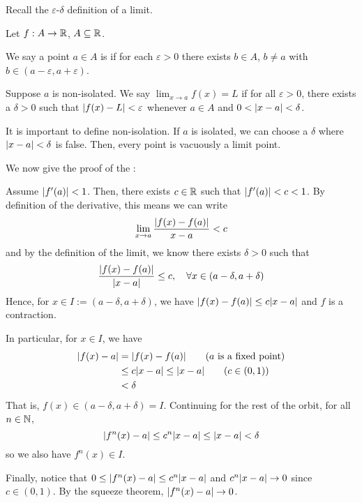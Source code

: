 \documentclass[class=pmath370,tikz,notes]{agony}
\begin{document}
Recall the $\varepsilon$-$\delta$ definition of a limit.

\begin{defn*}
  Let $f : A \to \mathbb{R}$, $A \subseteq \mathbb{R}$.

  We say a point $a \in A$ is  if for each $\varepsilon > 0$
  there exists $b \in A$, $b \neq a$ with $b \in (a-\varepsilon,a+\varepsilon)$.

  Suppose $a$ is non-isolated. We say $\lim_{x\to a}f(x) = L$
  if for all $\varepsilon > 0$, there exists a $\delta > 0$
  such that $\abs{f(x)-L}<\varepsilon$ whenever $a \in A$ and $0 < \abs{x-a} < \delta$.
\end{defn*}

It is important to define non-isolation.
If $a$ is isolated, we can choose a $\delta$ where $\abs{x-a} < \delta$ is false.
Then, every point is vacuously a limit point.

We now give the proof of the :
\begin{prf}
  Assume $\abs{f'(a)} < 1$. Then, there exists $c \in \mathbb{R}$ such that $\abs{f'(a)} < c < 1$.
  By definition of the derivative, this means we can write
  \[ \lim_{x\to a}\frac{\abs{f(x)-f(a)}}{x-a} < c \]
  and by the definition of the limit, we know there exists $\delta > 0$ such that
  \[ \frac{\abs{f(x)-f(a)}}{\abs{x-a}} \leq c \qc{\forall x\in (a-\delta,a+\delta)} \]
  Hence, for $x \in I := (a-\delta,a+\delta)$, we have $\abs{f(x)-f(a)} \leq c\abs{x-a}$
  and $f$ is a contraction.

  In particular, for $x \in I$, we have
  \begin{align*}
    \abs{f(x) - a}
     & = \abs{f(x) - f(a)} \tag{$a$ is a fixed point}     \\
     & \leq c\abs{x-a} \leq \abs{x-a} \tag{$c \in (0,1)$} \\
     & < \delta
  \end{align*}
  That is, $f(x) \in (a-\delta,a+\delta) = I$.
  Continuing for the rest of the orbit, for all $n \in \mathbb{N}$,
  \[ \abs{f^n(x) - a} \leq c^n\abs{x-a} \leq \abs{x-a} < \delta \]
  so we also have $f^n(x) \in I$.

  Finally, notice that $0 \leq \abs{f^n(x) - a} \leq c^n\abs{x-a}$
  and $c^n\abs{x-a} \to 0$ since $c \in (0,1)$.
  By the squeeze theorem, $\abs{f^n(x)-a} \to 0$.
\end{prf}
\end{document}
